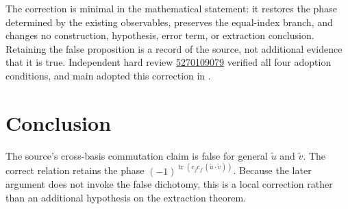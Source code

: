 \documentclass[11pt]{article}
\begin{document}
The correction is minimal in the mathematical statement: it restores the
phase determined by the existing observables, preserves the equal-index branch,
and changes no construction, hypothesis, error term, or extraction conclusion.
Retaining the false proposition is a record of the source, not additional
evidence that it is true.  Independent hard review
\href{https://github.com/Dengnifer/MIPStarRE-QPBT/pull/672#pullrequestreview-5270109079}%
{5270109079} verified all four adoption conditions, and main adopted this
correction in
.

\section{Conclusion}

The source's cross-basis commutation claim is false for general
$\widetilde u$ and $\widetilde v$.  The correct relation retains the phase
$(-1)^{\operatorname{tr}(e_je_{j'}(\widetilde u\cdot\widetilde v))}$.
Because the later argument does not invoke the false dichotomy, this is a
local correction rather than an additional hypothesis on the extraction
theorem.



\end{document}
